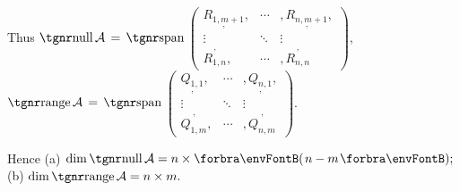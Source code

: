 \documentclass[a4paper, 11pt, UTF8]{article}
\begin{document}
\begin{large}
Thus $\null \mathcal{A}\,=\,\Spn${\normalsize$\begin{pmatrix} \underset{,}{R_{1,m+1}}, & \cdots & ,\underset{,}{R_{n,m+1}},\\ \vdots & \ddots & \vdots\\ \overset{,}{R_{1,n}}, & \cdots & ,\overset{,}{R_{n,n}}\end{pmatrix}$},\quad$\range \mathcal{A}\,=\,\Spn${\normalsize$\begin{pmatrix} \underset{,}{Q_{1,1}}, & \cdots & ,\underset{,}{Q_{n,1}},\\ \vdots & \ddots & \vdots\\ \overset{,}{Q_{1,m}}, & \cdots & ,\overset{,}{Q_{n,m}}\end{pmatrix}$}.\par\vspace{12pt}\quad
Hence (a) $\dim\null \mathcal{A}=n\times\Par{n-m};$\quad (b) $\dim\range \mathcal{A}=n\times m.$\PfEnd
\SepLine\pagebreak


\end{large}
\end{document}
